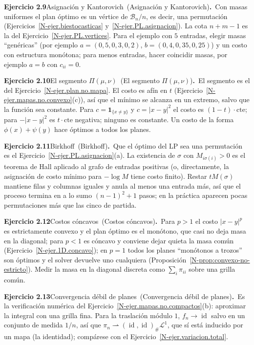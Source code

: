 \documentclass[11pt,a4paper]{amsart}
\newcommand{\id}{\operatorname{id}}
\newcommand{\B}{{\mathcal B}}
\newcommand{\LL}{{\mathcal L}}
\newcommand{\I}{{\mathbf 1}}
\theoremstyle{remark}
\theoremstyle{definition}
\numberwithin{subsection}{section}
\numberwithin{equation}{section}
\newcommand{\ejlabel}[2]{\par\medskip\noindent\textbf{Ejercicio #1}\ifx\relax#2\relax\else\ (#2)\fi\textbf{.}\ }
\begin{document}
\ejlabel{2.9}{Asignación y Kantorovich}Con masas uniformes el plan óptimo es un vértice de $\B_n/n$, es decir, una permutación (Ejercicios~\ref{N-ejer.biestocasticas} y~\ref{N-ejer.PL.asignacion}). La cota $n+m-1$ es la del Ejercicio~\ref{N-ejer.PL.vertices}. Para el ejemplo con $5$ entradas, elegir masas ``genéricas'' (por ejemplo $a=(0{,}5,0{,}3,0{,}2)$, $b=(0{,}4,0{,}35,0{,}25)$) y un costo con estructura monótona; para menos entradas, hacer coincidir masas, por ejemplo $a=b$ con $c_{ii}=0$.

\ejlabel{2.10}{El segmento $\Pi(\mu,\nu)$}El segmento es el del Ejercicio~\ref{N-ejer.plan.no.mapa}. El costo es afín en $t$ (Ejercicio~\ref{N-ejer.mapas.no.convexo}(c)), así que el mínimo se alcanza en un extremo, salvo que la función sea constante. Para $c=\I_{\{x\ne y\}}$ y $c=|x-y|^2$ el costo es $(1-t)\cdot\mathrm{cte}$; para $-|x-y|^2$ es $t\cdot\mathrm{cte}$ negativa; ninguno es constante. Un costo de la forma $\phi(x)+\psi(y)$ hace óptimos a todos los planes.

\ejlabel{2.11}{Birkhoff}Que el óptimo del LP sea una permutación es el Ejercicio~\ref{N-ejer.PL.asignacion}(a). La existencia de $\sigma$ con $M_{i\sigma(i)}>0$ es el teorema de Hall aplicado al grafo de entradas positivas (o, directamente, la asignación de costo mínimo para $-\log M$ tiene costo finito). Restar $tM(\sigma)$ mantiene filas y columnas iguales y anula al menos una entrada más, así que el proceso termina en a lo sumo $(n-1)^2+1$ pasos; en la práctica aparecen pocas permutaciones más que las cinco de partida.

\ejlabel{2.12}{Costos cóncavos}Para $p>1$ el costo $|x-y|^p$ es estrictamente convexo y el plan óptimo es el monótono, que casi no deja masa en la diagonal; para $p<1$ es cóncavo y conviene dejar quieta la masa común (Ejercicio~\ref{N-ejer.1D.concavo}); en $p=1$ todos los planes ``monótonos a trozos'' son óptimos y el solver devuelve uno cualquiera (Proposición~\ref{N-prop:convexo-no-estricto}). Medir la masa en la diagonal discreta como $\sum_i\pi_{ii}$ sobre una grilla común.

\ejlabel{2.13}{Convergencia débil de planes}Es la verificación numérica del Ejercicio~\ref{N-ejer.mapas.no.compactos}(b): aproximar la integral con una grilla fina. Para la traslación módulo $1$, $f_n\to\id$ salvo en un conjunto de medida $1/n$, así que $\pi_n\rightharpoonup(\id,\id)_\#\LL^1$, que sí está inducido por un mapa (la identidad); compárese con el Ejercicio~\ref{N-ejer.variacion.total}.
\end{document}
